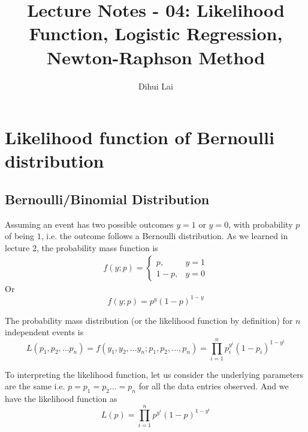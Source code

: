 \documentclass[12pt, oneside]{article}
\title{Lecture Notes - 04: Likelihood Function, Logistic Regression, Newton-Raphson Method}
\author{Dihui Lai}
\begin{document}
\maketitle
\tableofcontents

\vspace{.25in}
\section{Likelihood function of Bernoulli distribution}
\subsection{ Bernoulli/Binomial Distribution}
Assuming an event has two possible outcomes $y=1$ or $y=0$, with probability $p$ of being $1$, i.e. the outcome follows a Bernoulli distribution. As we learned in lecture 2, the probability mass function is 
\begin{align*}
f(y; p)=
\begin{cases}
p, &y=1\\
1-p,  &y=0
\end{cases}
\end{align*}
Or 
$$f(y;p)=p^y(1-p)^{1-y}$$

The probability mass distribution (or the likelihood function by definition) for $n$ independent events is
$$L(p_1, p_2,...p_n)=f(y_1, y_2, ...y_n; p_1, p_2, ..., p_n)=\prod_{i=1}^{n}p_{i}^{y^i}(1-p_{i})^{1-y^{i}}$$

To interpreting the likelihood function, let us consider the underlying parameters are the same i.e. $p=p_1=p_2...=p_n$ for all the data entries observed. And we have the likelihood function as
$$L(p)={\prod_{i=1}^{n}p^{y^i}(1-p)^{1-y^{i}}}$$
\end{document}
